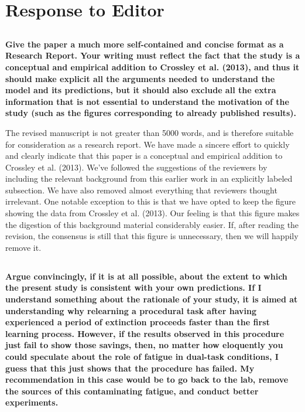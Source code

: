 \documentclass[10pt,a4paper]{article} \usepackage{amsmath} \usepackage{parskip}
\begin{document}
\section{Response to Editor}
\subsection{} \textbf{Give the paper a much more self-contained and concise
format as a Research Report. Your writing must reflect the fact that the study
is a conceptual and empirical addition to Crossley et al. (2013), and thus it
should make explicit all the arguments needed to understand the model and its
predictions, but it should also exclude all the extra information that is not
essential to understand the motivation of the study (such as the figures
corresponding to already published results).}

The revised manuscript is not greater than 5000 words, and is therefore suitable
for consideration as a research report. We have made a sincere effort to quickly
and clearly indicate that this paper is a conceptual and empirical addition to
Crossley et al. (2013). We've followed the suggestions of the reviewers by
including the relevant background from this earlier work in an explicitly
labeled subsection. We have also removed almost everything that reviewers
thought irrelevant. One notable exception to this is that we have opted to keep
the figure showing the data from Crossley et al. (2013). Our feeling is that
this figure makes the digestion of this background material considerably easier.
If, after reading the revision, the consensus is still that this figure is
unnecessary, then we will happily remove it.

\subsection{} \textbf{Argue convincingly, if it is at all possible, about the
extent to which the present study is consistent with your own predictions. If I
understand something about the rationale of your study, it is aimed at
understanding why relearning a procedural task after having experienced a period
of extinction proceeds faster than the first learning process. However, if the
results observed in this procedure just fail to show those savings, then, no
matter how eloquently you could speculate about the role of fatigue in dual-task
conditions, I guess that this just shows that the procedure has failed. My
recommendation in this case would be to go back to the lab, remove the sources
of this contaminating fatigue, and conduct better experiments.}
\end{document}
